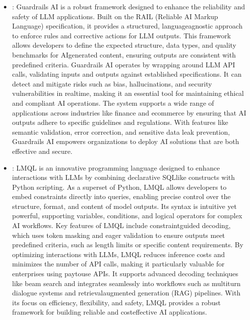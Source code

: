 \documentclass[letterpaper,11pt,english]{sphinxmanual}
\begin{document}
\begin{itemize}
\begin{description}
\begin{itemize}
\item {} 
\sphinxAtStartPar
{}

\end{itemize}

\end{description}

\item {} 
\sphinxAtStartPar
{}: Guardrails AI is a robust framework designed to
enhance the reliability and safety of LLM applications. Built on the
RAIL (Reliable AI Markup Language) specification, it provides a
structured, language\sphinxhyphen{}agnostic approach to enforce rules and corrective
actions for LLM outputs. This framework allows developers to define
the expected structure, data types, and quality benchmarks for
AI\sphinxhyphen{}generated content, ensuring outputs are consistent with predefined
criteria. Guardrails AI operates by wrapping around LLM API calls,
validating inputs and outputs against established specifications. It
can detect and mitigate risks such as bias, hallucinations, and
security vulnerabilities in real\sphinxhyphen{}time, making it an essential tool for
maintaining ethical and compliant AI operations. The system supports a
wide range of applications across industries like finance and
e\sphinxhyphen{}commerce by ensuring that AI outputs adhere to specific guidelines
and regulations. With features like semantic validation, error
correction, and sensitive data leak prevention, Guardrails AI empowers
organizations to deploy AI solutions that are both effective and
secure.

\item {} 
\sphinxAtStartPar
{}: LMQL  is
an innovative programming language designed to enhance interactions with
LLMs by combining declarative SQL\sphinxhyphen{}like constructs with Python scripting.
As a superset of Python, LMQL allows developers to embed constraints
directly into queries, enabling precise control over the structure,
format, and content of model outputs. Its syntax is intuitive yet
powerful, supporting variables, conditions, and logical operators for
complex AI workflows. Key features of LMQL include constraint\sphinxhyphen{}guided
decoding, which uses token masking and eager validation to ensure
outputs meet predefined criteria, such as length limits or specific
content requirements. By optimizing interactions with LLMs, LMQL
reduces inference costs and minimizes the number of API calls, making
it particularly valuable for enterprises using pay\sphinxhyphen{}to\sphinxhyphen{}use APIs. It
supports advanced decoding techniques like beam search and integrates
seamlessly into workflows such as multi\sphinxhyphen{}turn dialogue systems and
retrieval\sphinxhyphen{}augmented generation (RAG) pipelines. With its focus on
efficiency, flexibility, and safety, LMQL provides a robust framework
for building reliable and cost\sphinxhyphen{}effective AI applications.


\end{itemize}
\end{document}
